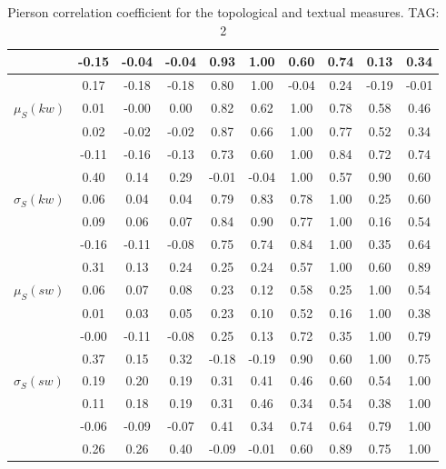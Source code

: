 \begin{table*}[h!]
\begin{center}
\begin{tabular}{| l | c | c | c | c | c | c | c | c | c |}
 & -0.15  & -0.04  & -0.04  & 0.93  & 1.00  & 0.60  & 0.74  & 0.13  & 0.34 \\\hline
 & 0.17  & -0.18  & -0.18  & 0.80  & 1.00  & -0.04  & 0.24  & -0.19  & -0.01 \\\hline
$\mu_S(kw)$ & 0.01  & -0.00  & 0.00  & 0.82  & 0.62  & 1.00  & 0.78  & 0.58  & 0.46 \\\hline
 & 0.02  & -0.02  & -0.02  & 0.87  & 0.66  & 1.00  & 0.77  & 0.52  & 0.34 \\\hline
 & -0.11  & -0.16  & -0.13  & 0.73  & 0.60  & 1.00  & 0.84  & 0.72  & 0.74 \\\hline
 & 0.40  & 0.14  & 0.29  & -0.01  & -0.04  & 1.00  & 0.57  & 0.90  & 0.60 \\\hline
$\sigma_S(kw)$ & 0.06  & 0.04  & 0.04  & 0.79  & 0.83  & 0.78  & 1.00  & 0.25  & 0.60 \\\hline
 & 0.09  & 0.06  & 0.07  & 0.84  & 0.90  & 0.77  & 1.00  & 0.16  & 0.54 \\\hline
 & -0.16  & -0.11  & -0.08  & 0.75  & 0.74  & 0.84  & 1.00  & 0.35  & 0.64 \\\hline
 & 0.31  & 0.13  & 0.24  & 0.25  & 0.24  & 0.57  & 1.00  & 0.60  & 0.89 \\\hline
$\mu_S(sw)$ & 0.06  & 0.07  & 0.08  & 0.23  & 0.12  & 0.58  & 0.25  & 1.00  & 0.54 \\\hline
 & 0.01  & 0.03  & 0.05  & 0.23  & 0.10  & 0.52  & 0.16  & 1.00  & 0.38 \\\hline
 & -0.00  & -0.11  & -0.08  & 0.25  & 0.13  & 0.72  & 0.35  & 1.00  & 0.79 \\\hline
 & 0.37  & 0.15  & 0.32  & -0.18  & -0.19  & 0.90  & 0.60  & 1.00  & 0.75 \\\hline
$\sigma_S(sw)$ & 0.19  & 0.20  & 0.19  & 0.31  & 0.41  & 0.46  & 0.60  & 0.54  & 1.00 \\\hline
 & 0.11  & 0.18  & 0.19  & 0.31  & 0.46  & 0.34  & 0.54  & 0.38  & 1.00 \\\hline
 & -0.06  & -0.09  & -0.07  & 0.41  & 0.34  & 0.74  & 0.64  & 0.79  & 1.00 \\\hline
 & 0.26  & 0.26  & 0.40  & -0.09  & -0.01  & 0.60  & 0.89  & 0.75  & 1.00 \\\hline
\end{tabular}
\caption{Pierson correlation coefficient for the topological and textual measures. TAG: 2}
\end{center}
\end{table*}